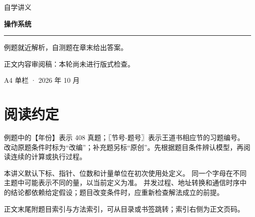 
\newcommand{\BookTitle}{操作系统}

\begin{titlepage}
\thispagestyle{empty}
\vspace*{25mm}
{\sffamily\color{accent}\fontsize{16}{24} 自学讲义}\par
\vspace{15mm}
{\sffamily\bfseries\color{ink}\fontsize{32}{45}\selectfont 操作系统}\par
\vspace{15mm}
\noindent\rule{\textwidth}{0.5pt}\par
\vspace{5mm}
\noindent 例题就近解析，自测题在章末给出答案。\par
\vspace{5mm}\noindent 正文内容审阅稿：本轮尚未进行版式检查。\par
\vfill
\noindent A4 单栏 · 2026 年 10 月\par
\end{titlepage}
\tableofcontents
\clearpage
{}\chapter*{阅读约定}
例题中的【年份】表示 408 真题；〖节号-题号〗表示王道书相应节的习题编号。
改动原题条件时标为“改编”；补充题另标“原创”。先根据题目条件辨认模型，再阅读连续的计算或执行过程。

本讲义默认下标、指针、位数和计量单位在初次使用处定义。
同一个字母在不同主题中可能表示不同的量，以当前定义为准。
并发过程、地址转换和通信时序中的结论都依赖给定假设；题目改变条件时，应重新检查解法成立的前提。

正文末尾附题目索引与方法索引，可从目录或书签跳转；索引右侧为正文页码。
\clearpage
{}
\setcounter{chapter}{0}



